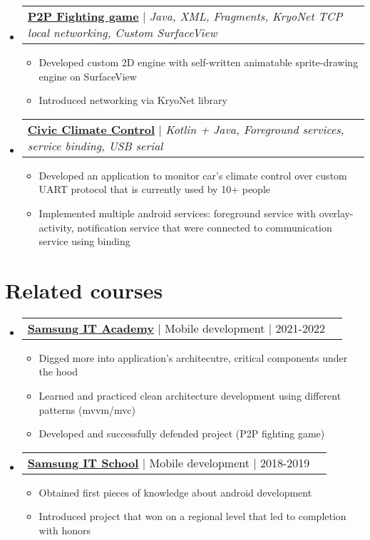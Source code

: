 \documentclass[a4paper,11pt]{article}
\makeatletter
\newcommand{\resumeItem}[1]{
  \item\small{
    {#1 \vspace{-2pt}}
  }
}
\newcommand{\resumeProjectHeading}[2]{
    \item
    \begin{tabular*}{0.97\textwidth}{l@{\extracolsep{\fill}}r}
      \small#1 & #2 \\
    \end{tabular*}\vspace{-7pt}
}
\newcommand{\resumeSubHeadingListStart}{\begin{itemize}[leftmargin=0.15in, label={}]}
\newcommand{\resumeSubHeadingListEnd}{\end{itemize}}
\newcommand{\resumeItemListStart}{\begin{itemize}}
\newcommand{\resumeItemListEnd}{\end{itemize}\vspace{-5pt}}
\makeatother
\begin{document}
    \resumeSubHeadingListStart
      \resumeProjectHeading
          {\href{https://github.com/Snow4DV/p2p-fighting-game}{\textbf{P2P Fighting game}} $|$ \textit{Java, XML, Fragments, KryoNet TCP local networking, Custom SurfaceView}}{ }
          \resumeItemListStart
            \resumeItem{Developed custom 2D engine with self-written animatable sprite-drawing engine on SurfaceView}
            \resumeItem{Introduced networking via KryoNet library}
          \resumeItemListEnd
    \resumeSubHeadingListEnd


    \resumeSubHeadingListStart
      \resumeProjectHeading
          {\href{https://github.com/Snow4DV/CivicClimateControl}{\textbf{Civic Climate Control}} $|$ \textit{Kotlin + Java, Foreground services, service binding, USB serial}}{ }
          \resumeItemListStart
            \resumeItem{Developed an application to monitor car's climate control over custom UART protocol that is currently used by 10+ people}
            \resumeItem{Implemented multiple android services: foreground service with overlay-activity, notification service that were connected to communication service using binding}
          \resumeItemListEnd
    \resumeSubHeadingListEnd


\section{Related courses}
    \resumeSubHeadingListStart
      \resumeProjectHeading
          {\href{https://github.com/Snow4DV/about-me/blob/master/certificates/samsung-it-academy.pdf}{\textbf{Samsung IT Academy}} $|$ Mobile development $|$ 2021-2022}{ }
          \resumeItemListStart
            \resumeItem{Digged more into application's architecutre, critical components under the hood }
            \resumeItem{Learned and practiced clean architecture development using different patterns (mvvm/mvc) }
            \resumeItem{Developed and successfully defended project (P2P fighting game) }
          \resumeItemListEnd
    \resumeSubHeadingListEnd

    \resumeSubHeadingListStart
      \resumeProjectHeading
          {\href{https://github.com/Snow4DV/about-me/blob/master/certificates/samsung-it-school.pdf}{\textbf{Samsung IT School}} $|$ Mobile development $|$ 2018-2019}{ }
          \resumeItemListStart
            \resumeItem{Obtained first pieces of knowledge about android development}
            \resumeItem{Introduced project that won on a regional level that led to completion with honors }
          \resumeItemListEnd
    \resumeSubHeadingListEnd
\end{document}
